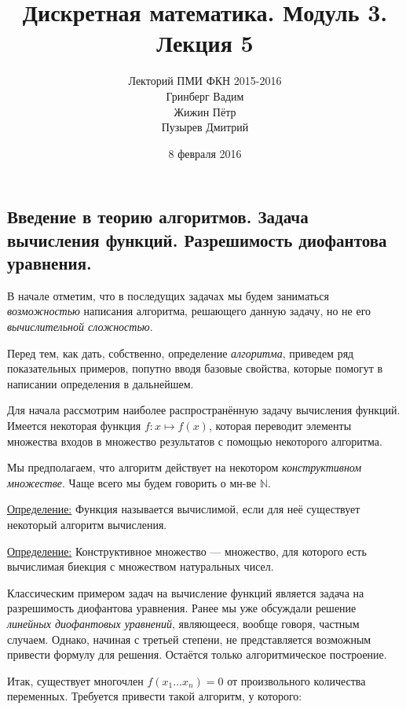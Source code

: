 \documentclass[a4paper, 12pt]{article}
\newcommand{\definition}{\underline{Определение:} }
\newcommand{\N}{\mathbb{N}}
\begin{document}
\title{Дискретная математика. Модуль 3. Лекция 5}
\author{Лекторий ПМИ ФКН 2015-2016\\Гринберг Вадим\\Жижин Пётр\\Пузырев Дмитрий}
\date{8 февраля 2016}

\maketitle

\subsection*{Введение в теорию алгоритмов. Задача вычисления функций. Разрешимость диофантова уравнения.}

В начале отметим, что в последущих задачах мы будем заниматься \textit{возможностью} написания алгоритма, решающего данную задачу, но не его \textit{вычислительной сложностью}.

Перед тем, как дать, собственно, определение \textit{алгоритма}, приведем ряд показательных примеров, попутно вводя базовые свойства, которые помогут в написании определения в дальнейшем.

Для начала рассмотрим наиболее распространённую задачу вычисления функций. Имеется некоторая функция $f: x \mapsto f(x)$, которая переводит элементы множества входов в множество результатов с помощью некоторого алгоритма.

Мы предполагаем, что алгоритм действует на некотором \textit{конструктивном множестве}. Чаще всего мы будем говорить о мн-ве $\N$.

\definition{Функция называется вычислимой, если для неё существует некоторый алгоритм вычисления.}

\definition{Конструктивное множество --- множество, для которого есть вычислимая биекция с множеством натуральных чисел.}

Классическим примером задач на вычисление функций является задача на разрешимость диофантова уравнения. Ранее мы уже обсуждали решение \textit{линейных диофантовых уравнений}, являющееся, вообще говоря, частным случаем. Однако, начиная с третьей степени, не представляется возможным привести формулу для решения. Остаётся только алгоритмическое построение.

Итак, существует многочлен $f(x_1 \ldots x_n) = 0$ от произвольного количества переменных. Требуется привести такой алгоритм, у которого:
\end{document}
